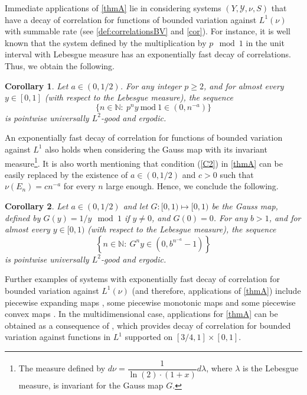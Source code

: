 \documentclass[11pt]{amsart}
\numberwithin{equation}{section}
\theoremstyle{definition}
\newcommand{\Mod}[1]{\ \mathrm{mod}\ #1}
\theoremstyle{plain}
\newcommand{\N}{{\mathbb N}}
\newtheorem{CorollaryL}{Corollary}
\begin{document}
Immediate applications of \cref{thmA} lie in considering systems $(Y,\mathcal{Y},\nu,S)$ that have a decay of correlation for functions of bounded variation against $L^1(\nu)$ with summable rate (see \cref{def:correlationsBV} and \cref{cor}). For instance, it is well known that the system defined by the multiplication by $p \mod 1$  in the unit interval with Lebesgue measure has an exponentially fast decay of correlations. Thus, we obtain the following.
\begin{CorollaryL}
    Let $a\in (0,1/2)$.  For any integer $p\geq 2$, and for almost every $y\in [0,1]$ (with respect to the Lebesgue measure), 
    the sequence
   $$
    \Big\{n\in\N:\ p^ny\Mod{1}\in (0,n^{-a})\Big\}$$
is pointwise universally $L^2$-good and ergodic. \label{corA}
\end{CorollaryL}
An exponentially fast decay of correlation for functions of bounded variation against $L^1$ also holds when considering the Gauss map with its invariant measure\footnote{The measure defined by $d\nu=\dfrac{1}{\ln(2)\cdot(1+x)}d\lambda$, where $\lambda$ is the Lebesgue measure, is invariant for the Gauss map $G$.}. It is also worth mentioning that condition (\ref{C2}) in \cref{thmA} can be easily replaced by the existence of $a\in (0,1/2)$ and $c>0$ such that $\nu(E_n)=cn^{-a}$ for every $n$ large enough. Hence, we conclude the following.
\begin{CorollaryL}
    Let $a\in (0,1/2)$ and let $G:[0,1)\mapsto [0,1)$ be the Gauss map, defined by $G(y)=1/y \mod{1}$ if $y\neq 0$, and $G(0)=0$.  
For any $b>1$, and for almost every $y\in [0,1)$ (with respect to the Lebesgue measure), the sequence
    $$\left\{n\in\N:\ G^ny\in (0, b^{n^{-a}}-1) \right\}$$
    is pointwise universally $L^2$-good and ergodic. \label{corB}
\end{CorollaryL}


Further examples of systems with exponentially fast decay of correlation for bounded variation against $L^1(\nu)$ (and therefore, applications of \cref{thmA}) include piecewise expanding maps \cite{Liverani}, some piecewise monotonic maps \cite{Liverani_Saussol_Vaienti} and some piecewise convex maps \cite{Cui}. In the multidimensional case, applications for \cref{thmA} can be obtained as a consequence of \cite[Theorem 1.1]{Eslami_Melbourne_Vaienti}, which provides decay of correlation for bounded variation against functions in $L^1$ supported on $[3/4,1]\times [0,1]$.




\vspace{0.7cm}
\end{document}
